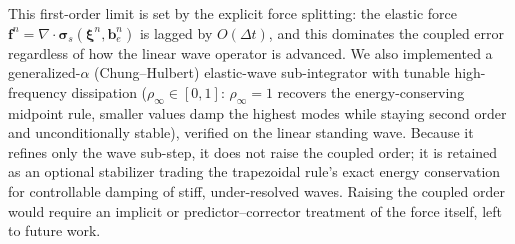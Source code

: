 \documentclass[final,3p,times]{elsarticle}
\newcommand{\xiv}{\bm{\xi}}
\newcommand{\be}{\bm{b}_e}
\newcommand{\sig}{\bm{\sigma}}
\newcommand{\grad}{\nabla}
\newcommand{\dive}{\grad\!\cdot\!}
\newcommand{\dt}{\Delta t}
\begin{document}
This first-order limit is set by the explicit force splitting: the elastic force
$\bm f^n=\dive\sig_{\!s}(\xiv^n,\be^n)$ is lagged by $O(\dt)$, and this dominates the coupled error
regardless of how the linear wave operator is advanced. We also implemented a generalized-$\alpha$
(Chung--Hulbert) elastic-wave sub-integrator with tunable high-frequency dissipation
($\rho_\infty\in[0,1]$: $\rho_\infty=1$ recovers the energy-conserving midpoint rule, smaller values
damp the highest modes while staying second order and unconditionally stable), verified on the
linear standing wave. Because it refines only the wave sub-step, it does not raise the
coupled order; it is retained as an optional stabilizer trading the trapezoidal rule's exact
energy conservation for controllable damping of stiff, under-resolved waves. Raising the coupled
order would require an implicit or predictor--corrector treatment of the force itself, left to
future work.



\end{document}
